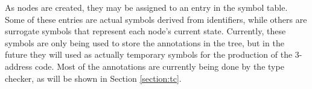 As nodes are created, they may be assigned to an entry in the symbol table. Some of these entries
are actual symbols derived from identifiers, while others are surrogate symbols that represent
each node's current state. Currently, these symbols are only being used to store the annotations
in the tree, but in the future they will used as actually temporary symbols for the production
of the 3-address code. Most of the annotations are currently being done by the type checker,
as will be shown in Section \ref{section:tc}.











